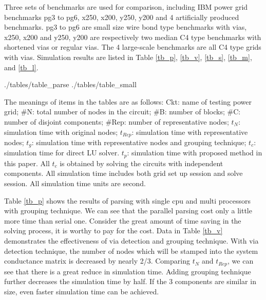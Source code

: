 \documentclass{sig-alternate}
\begin{document}
	Three sets of benchmarks are used for comparison, including 
	IBM power grid benchmarks pg3 to pg6, x250, x200, y250, y200 and 4 artificially produced benchmarks. pg3 to pg6 are 
	small size wire bond type benchmarks with vias, x250, x200 and y250, y200 are respectively two median C4 type benchmarks with
	shortened vias or regular vias. The 4 large-scale benchmarks are all C4 type grids with vias. Simulation results are 
	listed in Table \ref{tb_p}, \ref{tb_v}, \ref{tb_s}, \ref{tb_m}, and \ref{tb_l}.
	\begin{table}[h]
	   {./tables/table_parse} \label{tb_p}
	   \label{tb_v}
  	   {./tables/table_small} \label{tb_s}
	\end{table}
	\begin{table}[h]
  	   \label{tb_m}
  	   \label{tb_l}
	\end{table}
	The meanings of items in the tables are as follows: Ckt: name of testing power grid; \#N: total number of nodes in the circuit; 
	\#B: number of blocks; \#C: number of disjoint components; \#Rep: number of representative nodes; 
  	$t_N$: simulation time with original nodes; $t_{Rep}$: simulation time with representative nodes; 
	$t_g$: simulation time with representative nodes and grouping technique; $t_c$: simulation time for direct LU solver. 
	$t_p$: simulation time with proposed method in this paper.  
	All $t_c$ is obtained by solving the circuits with independent components. All 
	simulation time includes both grid set up session and solve session. All simulation time units are second.

	Table \ref{tb_p} shows the results of parsing with single cpu and multi processors with grouping technique. We can see that the
	parallel parsing cost only a little more time than serial one. Consider the great amount of time saving in the solving process,
	it is worthy to pay for the cost. 
	Data in Table \ref{tb_v} demonstrates the effectiveness of via detection and grouping technique. With via detection 
	technique, the 
	number of nodes which will be stamped into the system conductance matrix is decreased by nearly 2/3. Comparing $t_N$ 
	and $t_{Rep}$, we can see that there is a
	great reduce in simulation time. Adding grouping technique further decreases the simulation time by half. If the 3 components are 
	similar in size, even faster simulation time can be achieved.
\end{document}
